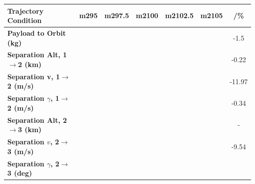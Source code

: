 \begin{table}[ht]
\centering


\begin{tabular}{l c c c c c c} 
	\hline \textbf{Trajectory Condition}
	&m295
	&m297.5
	&m2100
	&m2102.5
	&m2105
	& /\%
	\\
	\hline \textbf{Payload to Orbit (kg)}
	& \PayloadToOrbitmSPARTANNinetyFiveNoReturn
	& \PayloadToOrbitmSPARTANNinetySevenFiveNoReturn
	& \PayloadToOrbitmSPARTANStandardNoReturn
	& \PayloadToOrbitmSPARTANOneHundredTwoFiveNoReturn
	& \PayloadToOrbitmSPARTANOneHundredFiveNoReturn
	&-1.5
	\\
	\textbf{Separation Alt, 1$\rightarrow$2 (km)}
	& \firstsecondSeparationAltmSPARTANNinetyFiveNoReturn
	& \firstsecondSeparationAltmSPARTANNinetySevenFiveNoReturn
	& \firstsecondSeparationAltmSPARTANStandardNoReturn
	& \firstsecondSeparationAltmSPARTANOneHundredTwoFiveNoReturn
	& \firstsecondSeparationAltmSPARTANOneHundredFiveNoReturn
	&-0.22
	\\
	\textbf{Separation v, 1$\rightarrow$2 (m/s)}
	& \firstsecondSeparationvmSPARTANNinetyFiveNoReturn
	& \firstsecondSeparationvmSPARTANNinetySevenFiveNoReturn
	& \firstsecondSeparationvmSPARTANStandardNoReturn
	& \firstsecondSeparationvmSPARTANOneHundredTwoFiveNoReturn
	& \firstsecondSeparationvmSPARTANOneHundredFiveNoReturn
	&-11.97
	\\
	\textbf{Separation $\gamma$, 1$\rightarrow$2 (m/s)}
	& \firstsecondSeparationgammamSPARTANNinetyFiveNoReturn
	& \firstsecondSeparationgammamSPARTANNinetySevenFiveNoReturn
	& \firstsecondSeparationgammamSPARTANStandardNoReturn
	& \firstsecondSeparationgammamSPARTANOneHundredTwoFiveNoReturn
	& \firstsecondSeparationgammamSPARTANOneHundredFiveNoReturn
	&-0.34
	\\
	\textbf{Separation Alt, 2$\rightarrow$3 (km)}
	& \secondthirdSeparationAltmSPARTANNinetyFiveNoReturn
	& \secondthirdSeparationAltmSPARTANNinetySevenFiveNoReturn
	& \secondthirdSeparationAltmSPARTANStandardNoReturn
	& \secondthirdSeparationAltmSPARTANOneHundredTwoFiveNoReturn
	& \secondthirdSeparationAltmSPARTANOneHundredFiveNoReturn
	& -
	\\
	\textbf{Separation $v$, 2$\rightarrow$3 (m/s)}
	& \secondthirdSeparationvmSPARTANNinetyFiveNoReturn
	& \secondthirdSeparationvmSPARTANNinetySevenFiveNoReturn
	& \secondthirdSeparationvmSPARTANStandardNoReturn
	& \secondthirdSeparationvmSPARTANOneHundredTwoFiveNoReturn
	& \secondthirdSeparationvmSPARTANOneHundredFiveNoReturn
	&-9.54
	\\
	\textbf{Separation $\gamma$, 2$\rightarrow$3 (deg)}

\end{tabular}
\end{table}
